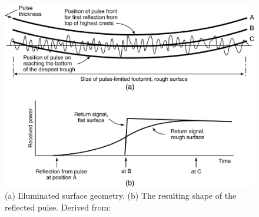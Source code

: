 \begin{figure}[H]
\centering
\includegraphics[width=0.8\linewidth]{Figures/Chapter2/swh_altimeter.png}
\caption{(a) Illuminated surface geometry. (b) The resulting shape of the reflected pulse. Derived from: \citep{Robinson2010}}
\label{fig:swh_altimeter}
\end{figure}









